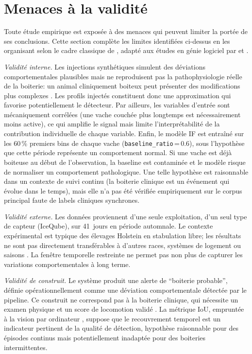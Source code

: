 \FloatBarrier
\section{Menaces à la validité}

Toute étude empirique est exposée à des menaces qui peuvent limiter la portée de ses
conclusions. Cette section complète les limites identifiées ci-dessus en les organisant
selon le cadre classique de \cite{shadish2002experimental}, adapté aux études en génie
logiciel par \cite{wohlin2012experimentation} et \cite{feldt2010validity}.

\textit{Validité interne.}
Les injections synthétiques simulent des déviations comportementales plausibles mais ne
reproduisent pas la pathophysiologie réelle de la boiterie: un animal cliniquement boiteux
peut présenter des modifications plus complexes \citep{whay2003assessment}. Les profils
injectés constituent donc une approximation qui favorise potentiellement le détecteur.
Par ailleurs, les variables d'entrée sont mécaniquement corrélées (une vache couchée plus
longtemps est nécessairement moins active), ce qui amplifie le signal mais limite
l'interprétabilité de la contribution individuelle de chaque variable.
Enfin, le modèle IF est entraîné sur les 60\,\% premiers bins de chaque vache
(\texttt{baseline\_ratio}\,=\,0.6), sous l'hypothèse que cette période représente un
comportement normal. Si une vache est déjà boiteuse au début de l'observation, la
baseline est contaminée et le modèle risque de normaliser un comportement pathologique.
Une telle hypothèse est raisonnable dans un contexte de suivi continu (la boiterie clinique
est un événement qui évolue dans le temps), mais elle n'a pas été vérifiée empiriquement
sur le corpus principal faute de labels cliniques synchrones.

\textit{Validité externe.}
Les données proviennent d'une seule exploitation, d'un seul type de capteur (IceQube),
sur 41~jours en période automnale. Le contexte expérimental est typique des élevages
Holstein en stabulation libre; les résultats ne sont pas directement transférables à
d'autres races, systèmes de logement ou saisons \citep{galindo2000relationships}. La
fenêtre temporelle restreinte ne permet pas non plus de capturer les variations
comportementales à long terme.

\textit{Validité de construit.}
Le système produit une alerte de ``boiterie probable'', définie opérationnellement comme
une déviation comportementale détectée par le pipeline. Ce construit ne correspond pas à
la boiterie clinique, qui nécessite un examen physique et un score de locomotion validé
\citep{sprecher1997lameness}. La métrique IoU, empruntée à la vision par ordinateur
\citep{everingham2010pascal}, suppose que le recouvrement temporel est un indicateur
pertinent de la qualité de détection, hypothèse raisonnable pour des épisodes continus
mais potentiellement inadaptée pour des boiteries intermittentes.

